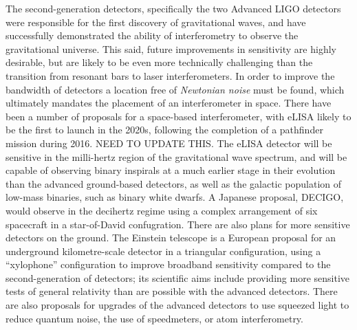 The second-generation detectors, specifically the two Advanced LIGO
detectors were responsible for the first discovery of gravitational
waves\cite{2016PhRvL.116m1103A}, and have successfully demonstrated
the ability of interferometry to observe the gravitational
universe. This said, future improvements in sensitivity are highly
desirable, but are likely to be even more technically challenging than
the transition from resonant bars to laser interferometers. In order
to improve the bandwidth of detectors a location free of
\emph{Newtonian noise} must be found, which ultimately mandates the
placement of an interferometer in space. There have been a number of
proposals for a space-based interferometer, with
eLISA\cite{2013GWN.....6....4A} likely to be the first to launch in
the 2020s, following the completion of a pathfinder mission during
2016\cite{2015JPhCS.610a2005A}. NEED TO UPDATE THIS. The eLISA detector will be sensitive
in the milli-hertz region of the gravitational wave spectrum, and will
be capable of observing binary inspirals at a much earlier stage in
their evolution than the advanced ground-based detectors, as well as
the galactic population of low-mass binaries, such as binary white
dwarfs. A Japanese proposal, DECIGO\cite{2011CQGra..28i4011K}, would
observe in the decihertz regime using a complex arrangement of six
spacecraft in a star-of-David confugration. There are also plans for
more sensitive detectors on the ground. The Einstein telescope is a
European proposal for an underground kilometre-scale detector in a
triangular configuration, using a ``xylophone'' configuration to
improve broadband sensitivity compared to the second-generation of
detectors; its scientific aims include providing more sensitive tests
of general relativity than are possible with the advanced
detectors\cite{2012CQGra..29l4013S}. There are also proposals for
upgrades of the advanced detectors to use squeezed light to reduce
quantum noise\cite{2015PhRvD..91f2005M}, the use of
speedmeters\cite{2014MUPB...69..519V,2002gr.qc....11088K}, or atom
interferometry\cite{2013PhRvL.110q1102G,2016PhRvD..93b1101C,2008PhRvD..78l2002D}.



